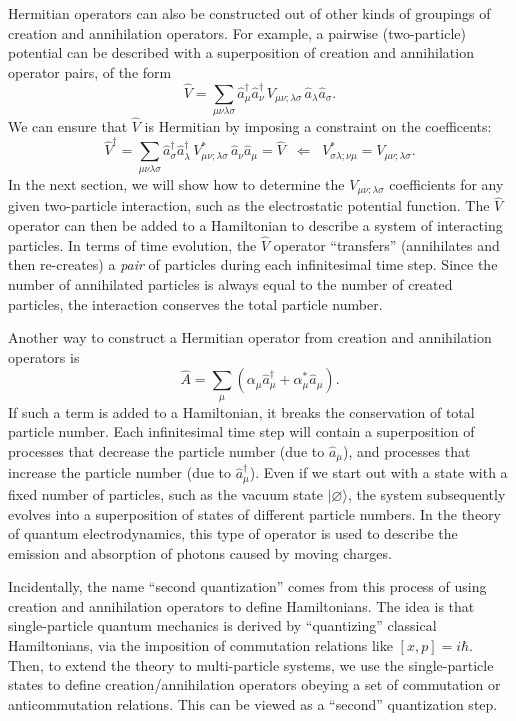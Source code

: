 \documentclass[pra,12pt]{revtex4}
\begin{document}
Hermitian operators can also be constructed out of other kinds of
groupings of creation and annihilation operators.  For example, a
pairwise (two-particle) potential can be described with a
superposition of creation and annihilation operator pairs, of the form
$$\hat{V} = \sum_{\mu\nu\lambda\sigma} \hat{a}^\dagger_\mu \hat{a}^\dagger_\nu \, V_{\mu\nu;\lambda\sigma}\, \hat{a}_\lambda \hat{a}_\sigma.$$
We can ensure that $\hat{V}$ is Hermitian by imposing a
constraint on the coefficents:
$$\hat{V}^\dagger = \sum_{\mu\nu\lambda\sigma} \hat{a}^\dagger_\sigma \hat{a}^\dagger_\lambda \, V_{\mu\nu;\lambda\sigma}^* \, \hat{a}_\nu \hat{a}_\mu = \hat{V} \;\;\Leftarrow \;\; V_{\sigma\lambda;\nu\mu}^* = V_{\mu\nu;\lambda\sigma}.$$
In the next section, we will show how to determine the
$V_{\mu\nu;\lambda\sigma}$ coefficients for any given two-particle
interaction, such as the electrostatic potential function.  The
$\hat{V}$ operator can then be added to a Hamiltonian to describe a
system of interacting particles.  In terms of time evolution, the
$\hat{V}$ operator ``transfers'' (annihilates and then re-creates) a
\textit{pair} of particles during each infinitesimal time step.  Since
the number of annihilated particles is always equal to the number of
created particles, the interaction conserves the total particle
number.

Another way to construct a Hermitian operator from creation and
annihilation operators is
$$\hat{A} = \sum_\mu \left(\alpha_\mu \hat{a}_\mu^\dagger + \alpha^*_\mu \hat{a}_\mu\right).$$
If such a term is added to a Hamiltonian, it breaks the conservation
of total particle number.  Each infinitesimal time step will contain a
superposition of processes that decrease the particle number (due to
$\hat{a}_\mu$), and processes that increase the particle number (due
to $\hat{a}_\mu^\dagger$).  Even if we start out with a state with a
fixed number of particles, such as the vacuum state
$|\varnothing\rangle$, the system subsequently evolves into a
superposition of states of different particle numbers.  In the
theory of quantum electrodynamics, this type of operator is used to
describe the emission and absorption of photons caused by moving
charges.

Incidentally, the name ``second quantization'' comes from this process
of using creation and annihilation operators to define Hamiltonians.
The idea is that single-particle quantum mechanics is derived by
``quantizing'' classical Hamiltonians, via the imposition of
commutation relations like $[x,p] = i\hbar$.  Then, to extend the
theory to multi-particle systems, we use the single-particle states to
define creation/annihilation operators obeying a set of commutation or
anticommutation relations.  This can be viewed as a ``second''
quantization step.
\end{document}
